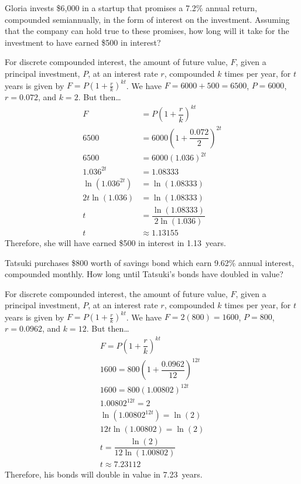 \documentclass[11pt,letterpaper]{article}
\begin{document}
\newpage



 Gloria invests \$6,000 in a startup that promises a 7.2\% annual return, compounded semiannually, in the form of interest on the investment. Assuming that the company can hold true to these promises, how long will it take for the investment to have earned \$500 in interest? \pspace

\sol For discrete compounded interest, the amount of future value, $F$, given a principal investment, $P$, at an interest rate $r$, compounded $k$ times per year, for $t$ years is given by $F= P \left(1 + \frac{r}{k} \right)^{kt}$. We have $F= 6000 + 500= 6500$, $P= 6000$, $r= 0.072$, and $k= 2$. But then\dots \pspace
	\[
	\begin{aligned}
	F&= P \left( 1 + \dfrac{r}{k} \right)^{kt} \\[0.3cm]
	6500&= 6000 \left( 1 + \dfrac{0.072}{2} \right)^{2t} \\[0.3cm]
	6500&= 6000 (1.036)^{2t} \\[0.3cm]
	1.036^{2t}&= 1.08333 \\[0.3cm]
	\ln(1.036^{2t})&= \ln(1.08333) \\[0.3cm]
	2t \ln(1.036)&= \ln(1.08333) \\[0.3cm]
	t&= \dfrac{\ln(1.08333)}{2 \ln(1.036)} \\[0.3cm]
	t&\approx 1.13155
	\end{aligned}
	\] \pspace
Therefore, she will have earned \$500 in interest in 1.13~years. 



\newpage



 Tatsuki purchases \$800 worth of savings bond which earn 9.62\% annual interest, compounded monthly. How long until Tatsuki's bonds have doubled in value? \pspace

\sol For discrete compounded interest, the amount of future value, $F$, given a principal investment, $P$, at an interest rate $r$, compounded $k$ times per year, for $t$ years is given by $F= P \left(1 + \frac{r}{k} \right)^{kt}$. We have $F= 2(800)= 1600$, $P= 800$, $r= 0.0962$, and $k= 12$. But then\dots \pspace
	\begin{gather*}
	F= P \left( 1 + \dfrac{r}{k} \right)^{kt} \\[0.3cm]
	1600= 800 \left( 1 + \dfrac{0.0962}{12} \right)^{12t} \\[0.3cm]
	1600= 800 (1.00802)^{12t} \\[0.3cm]
	1.00802^{12t}= 2 \\[0.3cm]
	\ln(1.00802^{12t})= \ln(2) \\[0.3cm]
	12t \ln(1.00802)= \ln(2) \\[0.3cm]
	t= \dfrac{\ln(2)}{12 \ln(1.00802)} \\[0.3cm]
	t\approx 7.23112
	\end{gather*}
Therefore, his bonds will double in value in 7.23~years. 
\end{document}
